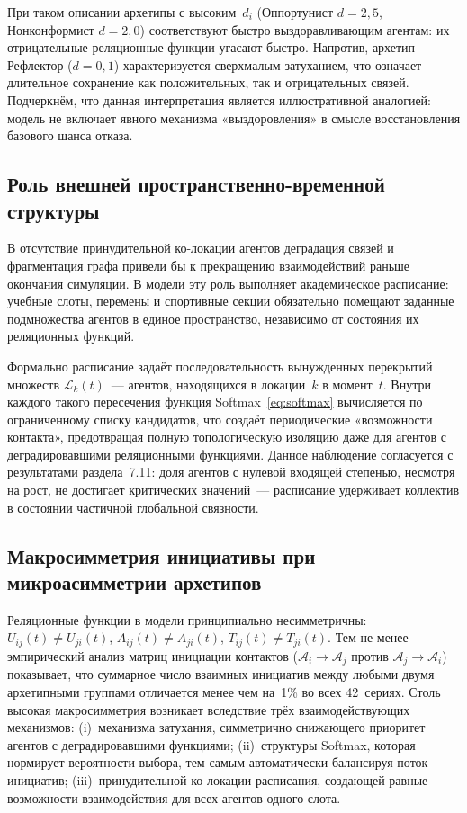 \documentclass[12pt]{article}
\begin{document}
При таком описании архетипы с высоким~$d_i$ (Оппортунист $d=2{,}5$,
Нонконформист $d=2{,}0$) соответствуют быстро выздоравливающим
агентам: их отрицательные реляционные функции угасают быстро.
Напротив, архетип Рефлектор ($d=0{,}1$) характеризуется
сверхмалым затуханием, что означает длительное сохранение
как положительных, так и отрицательных связей.
Подчеркнём, что данная интерпретация является иллюстративной
аналогией: модель не включает явного механизма «выздоровления»
в смысле восстановления базового шанса отказа.

\subsection{Роль внешней пространственно-временной структуры}

В отсутствие принудительной ко-локации агентов деградация связей
и фрагментация графа привели бы к прекращению взаимодействий
раньше окончания симуляции.
В модели эту роль выполняет академическое расписание: учебные
слоты, перемены и спортивные секции обязательно помещают
заданные подмножества агентов в единое пространство,
независимо от состояния их реляционных функций.

Формально расписание задаёт последовательность вынужденных
перекрытий множеств $\mathcal{L}_k(t)$~--- агентов, находящихся
в локации~$k$ в момент~$t$.
Внутри каждого такого пересечения функция Softmax~\eqref{eq:softmax}
вычисляется по ограниченному списку кандидатов, что создаёт
периодические «возможности контакта», предотвращая полную
топологическую изоляцию даже для агентов с деградировавшими
реляционными функциями.
Данное наблюдение согласуется с результатами
раздела~7.11: доля агентов с нулевой входящей степенью,
несмотря на рост, не достигает критических значений~---
расписание удерживает коллектив в состоянии частичной
глобальной связности.

\subsection{Макросимметрия инициативы при микроасимметрии архетипов}

Реляционные функции в модели принципиально несимметричны:
$U_{ij}(t) \neq U_{ji}(t)$, $A_{ij}(t) \neq A_{ji}(t)$, $T_{ij}(t) \neq T_{ji}(t)$.
Тем не менее эмпирический анализ матриц инициации контактов
($\mathcal{A}_i \to \mathcal{A}_j$ против $\mathcal{A}_j \to \mathcal{A}_i$)
показывает, что суммарное число взаимных инициатив между любыми
двумя архетипными группами отличается менее чем на~1\% во
всех 42~сериях. Столь высокая макросимметрия возникает
вследствие трёх взаимодействующих механизмов:
(i)~механизма затухания, симметрично снижающего приоритет
агентов с деградировавшими функциями;
(ii)~структуры Softmax, которая нормирует вероятности выбора,
тем самым автоматически балансируя поток инициатив;
(iii)~принудительной ко-локации расписания, создающей равные
возможности взаимодействия для всех агентов одного слота.
\end{document}
